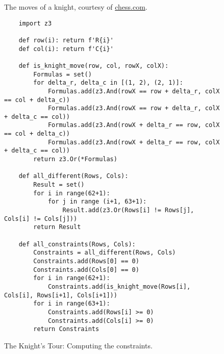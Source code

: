 \begin{figure}[!ht]
  \centering
  \caption{The moves of a knight, courtesy of \href{https://www.chess.com/}{chess.com}.}
  \label{fig:knight-moves.png}
\end{figure}

\begin{figure}[!ht]
\centering
\begin{verbatim}
    import z3
               
    def row(i): return f'R{i}'
    def col(i): return f'C{i}'
    
    def is_knight_move(row, col, rowX, colX):
        Formulas = set()
        for delta_r, delta_c in [(1, 2), (2, 1)]:
            Formulas.add(z3.And(rowX == row + delta_r, colX == col + delta_c))
            Formulas.add(z3.And(rowX == row + delta_r, colX + delta_c == col))
            Formulas.add(z3.And(rowX + delta_r == row, colX == col + delta_c))
            Formulas.add(z3.And(rowX + delta_r == row, colX + delta_c == col)) 
        return z3.Or(*Formulas)
            
    def all_different(Rows, Cols):
        Result = set()
        for i in range(62+1):
            for j in range (i+1, 63+1):
                Result.add(z3.Or(Rows[i] != Rows[j], Cols[i] != Cols[j]))
        return Result
            
    def all_constraints(Rows, Cols):
        Constraints = all_different(Rows, Cols)
        Constraints.add(Rows[0] == 0)
        Constraints.add(Cols[0] == 0)
        for i in range(62+1):
            Constraints.add(is_knight_move(Rows[i], Cols[i], Rows[i+1], Cols[i+1]))
        for i in range(63+1):
            Constraints.add(Rows[i] >= 0) 
            Constraints.add(Cols[i] >= 0) 
        return Constraints
\end{verbatim}
\vspace*{-0.3cm}
\caption{The Knight's Tour: Computing the constraints.}
\label{fig:Knight's Tour with Z3.ipynb-1}
\end{figure}



